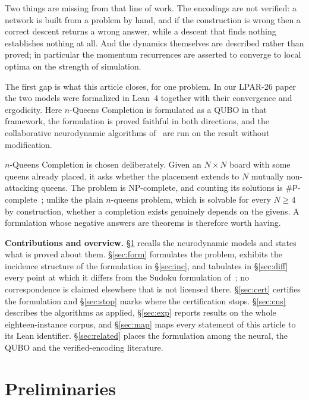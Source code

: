 \documentclass{easychair}
\newcommand{\secref}[1]{\hyperref[#1]{\textcolor{academicpurple}{\S\ref*{#1}}}}
\newcommand{\citeref}[1]{\textcolor{academicpurple}{\cite{#1}}}
\begin{document}
Two things are missing from that line of work. The encodings are not verified: a network is built
from a problem by hand, and if the construction is wrong then a correct descent returns a wrong
answer, while a descent that finds nothing establishes nothing at all. And the dynamics themselves
are described rather than proved; in particular the momentum recurrences are asserted to converge to
local optima on the strength of simulation.

The first gap is what this article closes, for one problem. In our LPAR-26 paper~\citeref{hnbm} the
two models were formalized in Lean~4 together with their convergence and ergodicity. Here
$n$-Queens Completion is formulated as a QUBO in that framework, the formulation is proved faithful
in both directions, and the collaborative neurodynamic algorithms of~\citeref{liwang2022} are run on
the result without modification.

$n$-Queens Completion is chosen deliberately. Given an $N\times N$ board with some queens already
placed, it asks whether the placement extends to $N$ mutually non-attacking queens. The problem is
\textsf{NP}-complete, and counting its solutions is $\#\textsf{P}$-complete~\citeref{gent2017};
unlike the plain $n$-queens problem, which is solvable for every $N\ge4$ by construction, whether a
completion exists genuinely depends on the givens. A formulation whose negative answers are theorems
is therefore worth having.

\medskip\noindent\textbf{Contributions and overview.} \secref{sec:prelim} recalls the neurodynamic
models and states what is proved about them. \secref{sec:form} formulates the problem, exhibits the
incidence structure of the formulation in \secref{sec:inc}, and tabulates in \secref{sec:diff} every
point at which it differs from the Sudoku formulation of~\citeref{liwang2022}; no correspondence is
claimed elsewhere that is not licensed there. \secref{sec:cert} certifies the formulation and
\secref{sec:stop} marks where the certification stops. \secref{sec:cns} describes the algorithms as
applied, \secref{sec:exp} reports results on the whole eighteen-instance corpus, and \secref{sec:map}
maps every statement of this article to its Lean identifier. \secref{sec:related} places the
formulation among the neural, the QUBO and the verified-encoding literature.

\section{Preliminaries}\label{sec:prelim}
\end{document}
